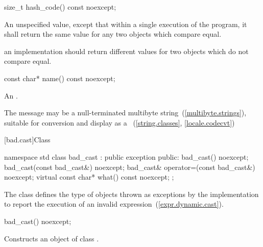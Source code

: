 %
\begin{itemdecl}
size_t hash_code() const noexcept;
\end{itemdecl}

\begin{itemdescr}
\pnum
\returns An unspecified value, except that within a single execution of the
program, it shall return the same value for any two 
objects which compare equal.

\pnum
\remark an implementation should return different values for two
 objects which do not compare equal.
\end{itemdescr}


%
\begin{itemdecl}
const char* name() const noexcept;
\end{itemdecl}

\begin{itemdescr}
\pnum
\returns
An  \ntbs.

\pnum
\remarks
The message may be a null-terminated multibyte string~(\ref{multibyte.strings}),
suitable for conversion and display as a
~(\ref{string.classes}, \ref{locale.codecvt})
\end{itemdescr}

[bad.cast]{Class }

%
\begin{codeblock}
namespace std {
  class bad_cast : public exception {
  public:
    bad_cast() noexcept;
    bad_cast(const bad_cast&) noexcept;
    bad_cast& operator=(const bad_cast&) noexcept;
    virtual const char* what() const noexcept;
  };
}
\end{codeblock}

\pnum
The class
defines the type of objects thrown
as exceptions by the implementation to report the execution of an invalid
expression~(\ref{expr.dynamic.cast}).

%
%
\begin{itemdecl}
bad_cast() noexcept;
\end{itemdecl}

\begin{itemdescr}
\pnum
\effects
Constructs an object of class
.
\end{itemdescr}

